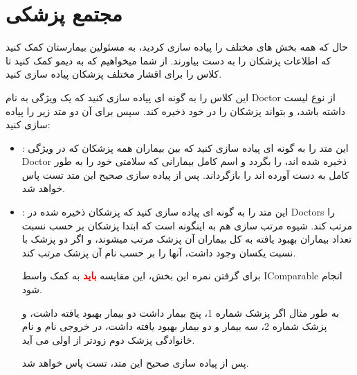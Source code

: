     \section{مجتمع پزشکی}
        حال که همه بخش های مختلف را پیاده سازی کردید، به مسئولین بیمارستان کمک کنید که اطلاعات پزشکان را به دست بیاورند.
        از شما میخواهیم که به دیمو کمک کنید تا کلاس 
        را برای اقشار مختلف پزشکان پیاده سازی کنید.
        
        این کلاس
        را به گونه ای پیاده سازی کنید که یک ویژگی به نام 
        Doctor
        از نوع لیست داشته باشد، و بتواند پزشکان را در خود ذخیره کند.
        سپس برای آن دو متد زیر را پیاده سازی کنید:
        \\
        \begin{itemize}
        \item 
            \grayBox{\textcolor{orange}{ListOfRecoveredPatients}}
            :
            این متد را به گونه ای پیاده سازی کنید که بین
            بیماران همه پزشکان که در ویژگی Doctor 
            ذخیره شده اند، را بگردد و اسم کامل
             بیمارانی که سلامتی خود را به طور کامل به دست آورده اند را بازگرداند.
            پس از پیاده سازی صحیح این متد تست
            \grayBox{\textcolor{dkgreen}{ListOfRecoveredPatientsTests}}
            پاس خواهد شد.

        \item
            \grayBox{\textcolor{orange}{SortDoctors}}
            :
            این متد را به گونه ای پیاده سازی کنید که پزشکان ذخیره شده در Doctors را مرتب کند.
            شیوه مرتب سازی هم به اینگونه است که ابتدا پزشکان بر حسب نسبت تعداد بیماران بهبود یافته به کل بیماران آن پزشک مرتب میشوند، و اگر دو پزشک با نسبت یکسان وجود داشت، آنها را بر حسب نام آن پزشک مرتب کند.        
            
            برای گرفتن نمره این بخش،
            این مقایسه \textbf{\textcolor{red}{باید}} به کمک واسط 
            IComparable
            انجام شود.
            
            به طور مثال اگر پزشک شماره 1، پنج بیمار داشت دو بیمار بهبود یافته داشت، و پزشک شماره 2، سه بیمار و دو بیمار بهبود یافته داشت،
            در خروجی نام و نام خانوادگی پزشک دوم زودتر از اولی می آید.
            
            پس از پیاده سازی صحیح این متد، تست
            \grayBox{\textcolor{dkgreen}{SortingDoctorsTests}}
            پاس خواهد شد.
            
        
        \end{itemize}
    \\
    \\
    \\
    \\
    